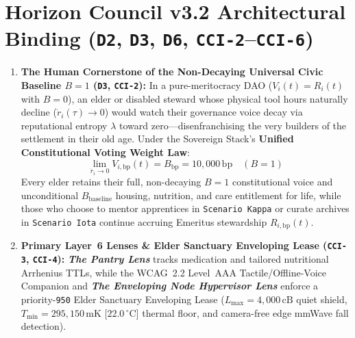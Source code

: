 \section{Horizon Council v3.2 Architectural Binding (\texttt{D2}, \texttt{D3}, \texttt{D6}, \texttt{CCI-2}--\texttt{CCI-6})}
\begin{enumerate}
    \item \textbf{The Human Cornerstone of the Non-Decaying Universal Civic Baseline $B = 1$ (\texttt{D3}, \texttt{CCI-2}):} In a pure-meritocracy DAO ($V_i(t) = R_i(t)$ with $B = 0$), an elder or disabled steward whose physical tool hours naturally decline ($\dot{r}_i(\tau) \to 0$) would watch their governance voice decay via reputational entropy $\lambda$ toward zero---disenfranchising the very builders of the settlement in their old age. Under the Sovereign Stack's \textbf{Unified Constitutional Voting Weight Law}:
    \begin{equation}
    \lim_{\dot{r}_i \to 0} V_{i,\mathrm{bp}}(t) = B_{\mathrm{bp}} = 10{,}000\,\mathrm{bp} \quad (B = 1)
    \label{eq:app21-elder-baseline}
    \end{equation}
    Every elder retains their full, non-decaying $B = 1$ constitutional voice and unconditional $B_{\mathrm{baseline}}$ housing, nutrition, and care entitlement for life, while those who choose to mentor apprentices in \texttt{Scenario Kappa} or curate archives in \texttt{Scenario Iota} continue accruing Emeritus stewardship $R_{i,\mathrm{bp}}(t)$.
    \item \textbf{Primary Layer~6 Lenses \& Elder Sanctuary Enveloping Lease (\texttt{CCI-3}, \texttt{CCI-4}):} \textbf{\textit{The Pantry Lens}} tracks medication and tailored nutritional Arrhenius TTLs, while the WCAG~2.2 Level~AAA Tactile/Offline-Voice Companion and \textbf{\textit{The Enveloping Node Hypervisor Lens}} enforce a priority-\texttt{950} Elder Sanctuary Enveloping Lease ($L_{\max} = 4{,}000\,\mathrm{cB}$ quiet shield, $T_{\min} = 295{,}150\,\mathrm{mK}$ [$22.0\,^\circ\mathrm{C}$] thermal floor, and camera-free edge mmWave fall detection).
\end{enumerate}

